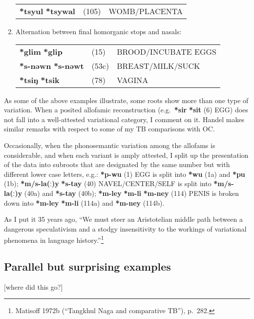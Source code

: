 \begin{enumerate}
\begin{tabular}{lll}
\textbf{*tsyul} \STEDTU{⪤} \textbf{*tsywal} &(105)	&WOMB/PLACENTA\\
\end{tabular}

\item %
Alternation between final homorganic stops and nasals:\nopagebreak[4]

\begin{tabular}{lll}
\textbf{*glim} \STEDTU{⪤} \textbf{*glip} 	&(15)	&BROOD/INCUBATE EGGS\\
\textbf{*s-nəwn} \STEDTU{⪤} \textbf{*s-nəwt} &(53c)	&BREAST/MILK/SUCK\\
\textbf{*tsiŋ} \STEDTU{⪤} \textbf{*tsik} &(78)	 	&VAGINA\\
\end{tabular}
\end{enumerate}


As some of the above examples illustrate, some roots show more than one type
of variation.  When a posited allofamic reconstruction (e.g.\ \textbf{*sir}  \textbf{*sit} (6)
EGG) does not fall into a well-attested variational category, I comment on it. 
Handel makes similar remarks with respect to some of my TB comparisons with OC.


Occasionally, when the phonosemantic variation among the allofams is
considerable, and when each variant is amply attested, I split up the
presentation of the data into subroots that are designated by the same number
but with different lower case letters, e.g.: \textbf{*p-wu} (1) EGG is split into \textbf{*wu}
(1a) and \textbf{*pu} (1b);
\textbf{*m/s-la(ː)y}  \textbf{*s-tay} (40) NAVEL/CENTER/SELF is split into
\textbf{*m/s-la(ː)y} (40a) and \textbf{*s-tay} (40b);
\textbf{*m-ley}  \textbf{*m-li}  \textbf{*m-ney} (114) PENIS is
broken down into \textbf{*m-ley}  \textbf{*m-li} (114a)
and \textbf{*m-ney} (114b).


As I put it 35 years ago, “We must steer an Aristotelian middle path between
a dangerous speculativism and a stodgy insensitivity to the workings of
variational phenomena in language history.”\footnote{Matisoff 1972b (“Tangkhul
Naga and comparative TB”), p.~282.}

\subsection{Parallel but surprising examples}

[where did this go?]

